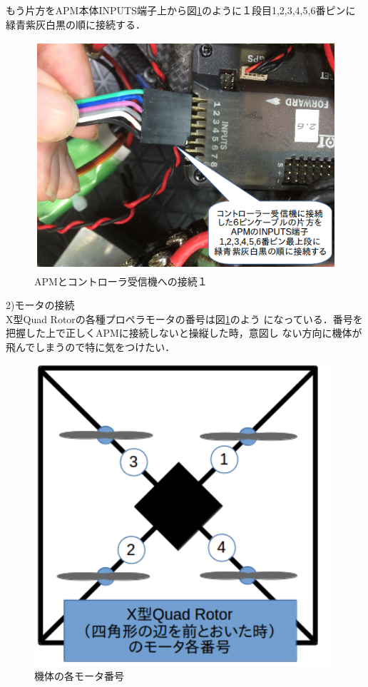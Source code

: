 \documentclass[12pt,oneside]{sotsuken_paper}
\begin{document}
もう片方をAPM本体INPUTS端子上から図\ref{fig:setuzoku4}のように１段目1,2,3,4,5,6番ピンに緑青紫灰白黒の順に接続する．\\

\begin{figure}[H]
\begin{center}
\includegraphics[width=140mm]{img/setuzoku4.png}
\end{center}
\caption{APMとコントローラ受信機への接続１}
\label{fig:setuzoku4}
\end{figure}

2)モータの接続\\
  X型Quad Rotorの各種プロペラモータの番号は図\ref{fig:setuzoku4}のよう  になっている．番号を把握した上で正しくAPMに接続しないと操縦した時，意図し  ない方向に機体が飛んでしまうので特に気をつけたい．

\begin{figure}[H]
\begin{center}
\includegraphics[width=110mm]{img/setuzoku5.png}
\end{center}
\caption{機体の各モータ番号}
\label{fig:setuzoku5}
\end{figure}
\end{document}
